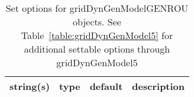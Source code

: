 \begin{table}[ht]
\centering
\begin{tabular}{p{5cm} c c p{7cm}}
\hline
string(s) & type & default & description \\
\hline
\hline
\end{tabular}
\caption{Set options for gridDynGenModelGENROU objects. See Table~\ref{table:gridDynGenModel5} for additional settable options through gridDynGenModel5}
\label{table:gridDynGenModelGENROU}
\end{table}
